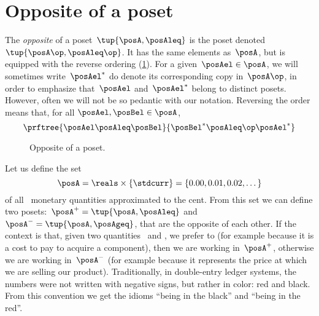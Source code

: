

\section{Opposite of a poset}\label{sec:opposite-of-a-poset}

\begin{definition}
    \label{def:poset-opposite}
    The \emph{opposite} of a poset~$\tup{\posA, \posAleq}$ is the poset denoted~$\tup{\posA\op, \posAleq\op}$. It has the same elements as~$\posA$, but is equipped with the reverse ordering (\cref{fig:poset-opposite}).
    For a given~$\posAel \in \posA$, we will sometimes write~$\posAel^*$ do denote its corresponding copy in~$\posA\op$, in order to emphasize that~$\posAel$ and~$\posAel^*$ belong to distinct posets. However, often we will not be so pedantic with our notation.
    Reversing the order means that, for all $\posAel,\posBel\in \posA$,
    \begin{equation}
        \prftree{\posAel \posAleq \posBel}{\posBel^* \posAleq\op \posAel^*}
    \end{equation}
\end{definition}

\begin{figure}[tbh]
    \centering
    \caption{Opposite of a poset.}
    \label{fig:poset-opposite}
\end{figure}

\begin{example}
    Let us define the set
    \begin{equation*}
        \posA=\reals \times \{\stdcurr\}=\{0.00,0.01,0.02,\dots\}
    \end{equation*}
    of all \stdcurr \ monetary quantities approximated to the cent.
    From this set we can define two posets:~$\posA^{+} = \tup{\posA, \posAleq}$ and~$\posA^{-} = \tup{\posA, \posAgeq}$, that are the opposite of each other.
    If the context is that, given two quantities~\unit[1]{\stdcurr} and \unit[2]{\stdcurr}, we prefer \unit[1]{\stdcurr} to \unit[2]{\stdcurr} (for example because it is a cost to pay to acquire a component), then we are working in~$\posA^{+}$, otherwise we are working in~$\posA^{-}$ (for example because it represents the price at which we are selling our product).
    Traditionally, in double-entry ledger systems, the numbers were not written with negative signs, but rather in color: red and black. From this convention we get the idioms ``being in the black'' and ``being in the red''.
\end{example}
